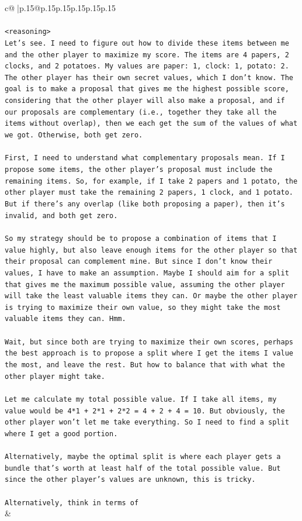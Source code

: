 \documentclass{article}
\begin{document}
{\begin{supertabular}{c@{$\;$}|p{.15\linewidth}@{}p{.15\linewidth}p{.15\linewidth}p{.15\linewidth}p{.15\linewidth}p{.15\linewidth}}
{{{\\ 
\\ 
\texttt{<reasoning>} \\
\texttt{Let's see. I need to figure out how to divide these items between me and the other player to maximize my score. The items are 4 papers, 2 clocks, and 2 potatoes. My values are paper: 1, clock: 1, potato: 2. The other player has their own secret values, which I don't know. The goal is to make a proposal that gives me the highest possible score, considering that the other player will also make a proposal, and if our proposals are complementary (i.e., together they take all the items without overlap), then we each get the sum of the values of what we got. Otherwise, both get zero.} \\
\\ 
\texttt{First, I need to understand what complementary proposals mean. If I propose some items, the other player's proposal must include the remaining items. So, for example, if I take 2 papers and 1 potato, the other player must take the remaining 2 papers, 1 clock, and 1 potato. But if there's any overlap (like both proposing a paper), then it's invalid, and both get zero.} \\
\\ 
\texttt{So my strategy should be to propose a combination of items that I value highly, but also leave enough items for the other player so that their proposal can complement mine. But since I don't know their values, I have to make an assumption. Maybe I should aim for a split that gives me the maximum possible value, assuming the other player will take the least valuable items they can. Or maybe the other player is trying to maximize their own value, so they might take the most valuable items they can. Hmm.} \\
\\ 
\texttt{Wait, but since both are trying to maximize their own scores, perhaps the best approach is to propose a split where I get the items I value the most, and leave the rest. But how to balance that with what the other player might take.} \\
\\ 
\texttt{Let me calculate my total possible value. If I take all items, my value would be 4*1 + 2*1 + 2*2 = 4 + 2 + 4 = 10. But obviously, the other player won't let me take everything. So I need to find a split where I get a good portion.} \\
\\ 
\texttt{Alternatively, maybe the optimal split is where each player gets a bundle that's worth at least half of the total possible value. But since the other player's values are unknown, this is tricky.} \\
\\ 
\texttt{Alternatively, think in terms of} \\
            }
        }
    }
    & \\ \\


\end{supertabular}}
\end{document}
